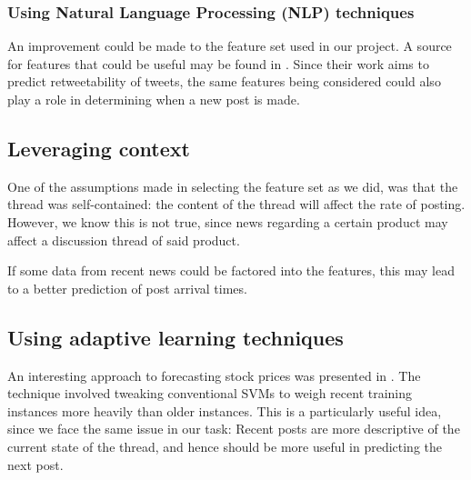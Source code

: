 \subsubsection{Using Natural Language Processing (NLP) techniques}
An improvement could be made to the feature set used in our project. A source 
for features that could be useful may be found in . Since their 
work aims to predict retweetability of tweets, the same features being 
considered could also play a role in determining when a new post is made.

\subsection{Leveraging context}
One of the assumptions made in selecting the feature set as we did, was that the 
thread was self-contained: the content of the thread will affect the rate of 
posting. However, we know this is not true, since news regarding a certain 
product may affect a discussion thread of said product.

If some data from recent news could be factored into the features, this may lead 
to a better prediction of post arrival times.

\subsection{Using adaptive learning techniques}
An interesting approach to forecasting stock prices was presented in 
. The technique involved tweaking conventional SVMs to weigh 
recent training instances more heavily than older instances. This is a 
particularly useful idea, since we face the same issue in our task: Recent posts 
are more descriptive of the current state of the thread, and hence should be 
more useful in predicting the next post.

